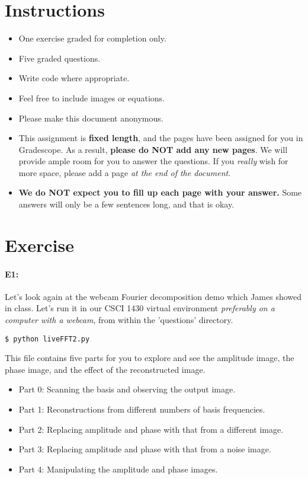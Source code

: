 \section*{Instructions}
\begin{itemize}
  \item One exercise graded for completion only. 
  \item Five graded questions.
  \item Write code where appropriate.
  \item Feel free to include images or equations.
  \item Please make this document anonymous.
  \item This assignment is \textbf{fixed length}, and the pages have been assigned for you in Gradescope. As a result, \textbf{please do NOT add any new pages}. We will provide ample room for you to answer the questions. If you \emph{really} wish for more space, please add a page \emph{at the end of the document}.
  \item \textbf{We do NOT expect you to fill up each page with your answer.} Some answers will only be a few sentences long, and that is okay.
\end{itemize}


\section*{Exercise}

\paragraph{E1:} Let's look again at the webcam Fourier decomposition demo which James showed in class. Let's run it in our CSCI 1430 virtual environment \emph{preferably on a computer with a webcam}, from within the 'questions' directory.

\begin{verbatim}
$ python liveFFT2.py
\end{verbatim}

This file contains five parts for you to explore and see the amplitude image, the phase image, and the effect of the reconstructed image.
\begin{itemize}
    \item Part 0: Scanning the basis and observing the output image.
    \item Part 1: Reconstructions from different numbers of basis frequencies.
    \item Part 2: Replacing amplitude and phase with that from a different image.
    \item Part 3: Replacing amplitude and phase with that from a noise image.
    \item Part 4: Manipulating the amplitude and phase images.
\end{itemize}

